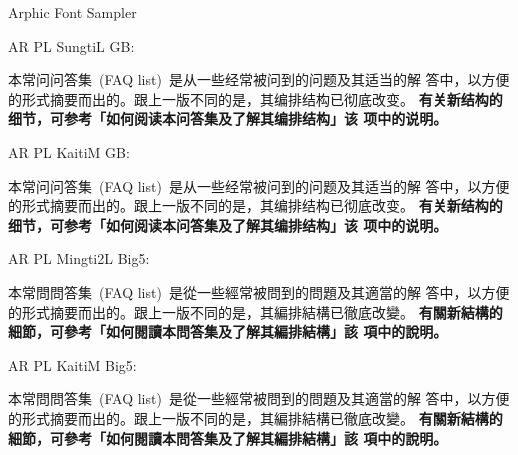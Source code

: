 \documentclass[12pt]{article}
\begin{document}
\begin{center}
\Large Arphic Font Sampler
\end{center}

\begin{CJK*}{UTF8}{}

\CJKtilde

\noindent AR PL SungtiL GB:

\noindent 本常问问答集~(FAQ list)~是从一些经常被问到的问题及其适当的解
答中，以方便的形式摘要而出的。跟上一版不同的是，其编排结构已彻底改变。
\textbf{有关新结构的细节，可参考「如何阅读本问答集及了解其编排结构」该
  项中的说明。}

\vspace{1cm}

\noindent AR PL KaitiM GB:

\noindent 本常问问答集~(FAQ list)~是从一些经常被问到的问题及其适当的解
答中，以方便的形式摘要而出的。跟上一版不同的是，其编排结构已彻底改变。
\textbf{有关新结构的细节，可参考「如何阅读本问答集及了解其编排结构」该
  项中的说明。}

\vspace{1cm}

\noindent AR PL Mingti2L Big5:

\noindent 本常問問答集~(FAQ list)~是從一些經常被問到的問題及其適當的解
答中，以方便的形式摘要而出的。跟上一版不同的是，其編排結構已徹底改變。
\textbf{有關新結構的細節，可參考「如何閱讀本問答集及了解其編排結構」該
  項中的說明。}

\vspace{1cm}

\noindent AR PL KaitiM Big5:

\noindent 本常問問答集~(FAQ list)~是從一些經常被問到的問題及其適當的解
答中，以方便的形式摘要而出的。跟上一版不同的是，其編排結構已徹底改變。
\textbf{有關新結構的細節，可參考「如何閱讀本問答集及了解其編排結構」該
  項中的說明。}

\end{CJK*}
\end{document}
